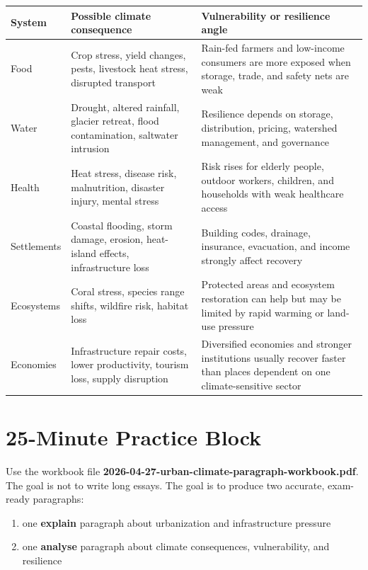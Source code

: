 \documentclass[11pt,a4paper]{article}
\newcommand{\term}[1]{\textcolor{HeadingBlue}{\textbf{#1}}}
\newcommand{\exam}[1]{\textcolor{AccentTeal}{\textbf{#1}}}
\begin{document}
\begin{tabularx}{\textwidth}{L{0.2\textwidth}Y Y}
\toprule
\textbf{System} & \textbf{Possible climate consequence} & \textbf{Vulnerability or resilience angle} \\
\midrule
Food & Crop stress, yield changes, pests, livestock heat stress, disrupted
transport & Rain-fed farmers and low-income consumers are more exposed when
storage, trade, and safety nets are weak \\
Water & Drought, altered rainfall, glacier retreat, flood contamination,
saltwater intrusion & Resilience depends on storage, distribution, pricing,
watershed management, and governance \\
Health & Heat stress, disease risk, malnutrition, disaster injury, mental
stress & Risk rises for elderly people, outdoor workers, children, and
households with weak healthcare access \\
Settlements & Coastal flooding, storm damage, erosion, heat-island effects,
infrastructure loss & Building codes, drainage, insurance, evacuation, and
income strongly affect recovery \\
Ecosystems & Coral stress, species range shifts, wildfire risk, habitat loss &
Protected areas and ecosystem restoration can help but may be limited by rapid
warming or land-use pressure \\
Economies & Infrastructure repair costs, lower productivity, tourism loss,
supply disruption & Diversified economies and stronger institutions usually
recover faster than places dependent on one climate-sensitive sector \\
\bottomrule
\end{tabularx}

\section{25-Minute Practice Block}

Use the workbook file \term{2026-04-27-urban-climate-paragraph-workbook.pdf}.
The goal is not to write long essays. The goal is to produce two accurate,
exam-ready paragraphs:

\begin{enumerate}
  \item one \exam{explain} paragraph about urbanization and infrastructure
  pressure
  \item one \exam{analyse} paragraph about climate consequences, vulnerability,
  and resilience
\end{enumerate}
\end{document}
